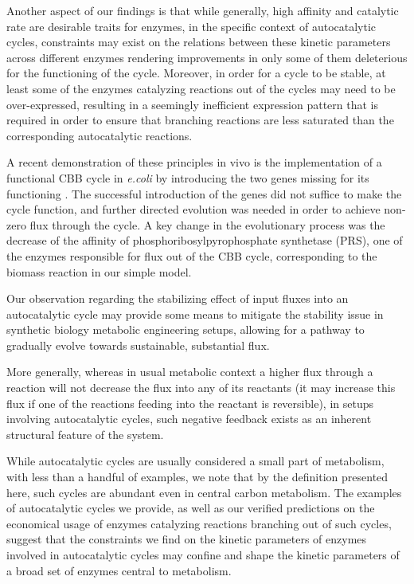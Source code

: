 \documentclass[a4page,notitlepage]{article}
\begin{document}
Another aspect of our findings is that while generally, high affinity and catalytic rate are desirable traits for enzymes, in the specific context of autocatalytic cycles, constraints may exist on the relations between these kinetic parameters across different enzymes rendering improvements in only some of them deleterious for the functioning of the cycle.
Moreover, in order for a cycle to be stable, at least some of the enzymes catalyzing reactions out of the cycles may need to be over-expressed, resulting in a seemingly inefficient expression pattern that is required in order to ensure that branching reactions are less saturated than the corresponding autocatalytic reactions.

A recent demonstration of these principles in vivo is the implementation of a functional CBB cycle in \emph{e.coli} by introducing the two genes missing for its functioning \cite{Antonovski2016}.
The successful introduction of the genes did not suffice to make the cycle function, and further directed evolution was needed in order to achieve non-zero flux through the cycle.
A key change in the evolutionary process was the decrease of the affinity of phosphoribosylpyrophosphate synthetase (PRS), one of the enzymes responsible for flux out of the CBB cycle, corresponding to the biomass reaction in our simple model.

Our observation regarding the stabilizing effect of input fluxes into an autocatalytic cycle may provide some means to mitigate the stability issue in synthetic biology metabolic engineering setups, allowing for a pathway to gradually evolve towards sustainable, substantial flux.

More generally, whereas in usual metabolic context a higher flux through a reaction will not decrease the flux into any of its reactants (it may increase this flux if one of the reactions feeding into the reactant is reversible), in setups involving autocatalytic cycles, such negative feedback exists as an inherent structural feature of the system.

While autocatalytic cycles are usually considered a small part of metabolism, with less than a handful of examples, we note that by the definition presented here, such cycles are abundant even in central carbon metabolism.
The examples of autocatalytic cycles we provide, as well as our verified predictions on the economical usage of enzymes catalyzing reactions branching out of such cycles, suggest that the constraints we find on the kinetic parameters of enzymes involved in autocatalytic cycles may confine and shape the kinetic parameters of a broad set of enzymes central to metabolism.
\end{document}
